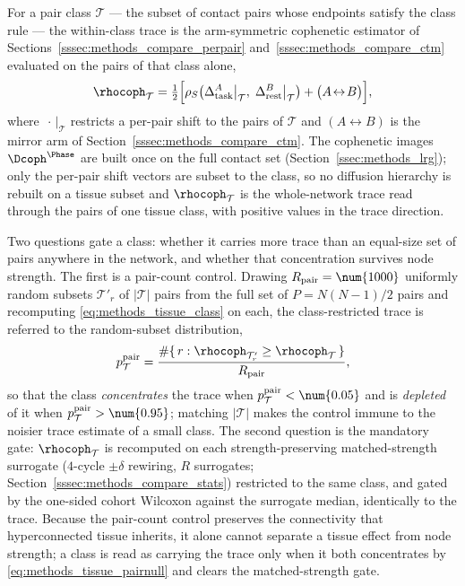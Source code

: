 For a pair class \(\mathcal{T}\) --- the subset of contact pairs whose endpoints satisfy the class rule --- the within-class trace is the arm-symmetric cophenetic estimator of Sections~\ref{sssec:methods_compare_perpair} and~\ref{sssec:methods_compare_ctm} evaluated on the pairs of that class alone,
\begin{equation}
    \rhocoph_{\mathcal{T}} = \tfrac{1}{2}\Big[\rho_{S}\!\left(\Delta_{\rm task}^{A}\big|_{\mathcal{T}},\; \Delta_{\rm rest}^{B}\big|_{\mathcal{T}}\right) + \big(A\!\leftrightarrow\!B\big)\Big],
    \label{eq:methods_tissue_class}
\end{equation}
where \(\,\cdot\,\big|_{\mathcal{T}}\) restricts a per-pair shift to the pairs of \(\mathcal{T}\) and \((A\!\leftrightarrow\!B)\) is the mirror arm of Section~\ref{sssec:methods_compare_ctm}. The cophenetic images \(\Dcoph^{\Phase}\) are built once on the full contact set (Section~\ref{ssec:methods_lrg}); only the per-pair shift vectors are subset to the class, so no diffusion hierarchy is rebuilt on a tissue subset and \(\rhocoph_{\mathcal{T}}\) is the whole-network trace read through the pairs of one tissue class, with positive values in the trace direction.

Two questions gate a class: whether it carries more trace than an equal-size set of pairs anywhere in the network, and whether that concentration survives node strength. The first is a pair-count control. Drawing \(R_{\rm pair} = \num{1000}\) uniformly random subsets \(\mathcal{T}'_{r}\) of \(|\mathcal{T}|\) pairs from the full set of \(P = N(N-1)/2\) pairs and recomputing \eqref{eq:methods_tissue_class} on each, the class-restricted trace is referred to the random-subset distribution,
\begin{equation}
    p^{\rm pair}_{\mathcal{T}} = \frac{\#\{\, r : \rhocoph_{\mathcal{T}'_{r}} \ge \rhocoph_{\mathcal{T}} \,\}}{R_{\rm pair}},
    \label{eq:methods_tissue_pairnull}
\end{equation}
so that the class \emph{concentrates} the trace when \(p^{\rm pair}_{\mathcal{T}} < \num{0.05}\) and is \emph{depleted} of it when \(p^{\rm pair}_{\mathcal{T}} > \num{0.95}\); matching \(|\mathcal{T}|\) makes the control immune to the noisier trace estimate of a small class. The second question is the mandatory gate: \(\rhocoph_{\mathcal{T}}\) is recomputed on each strength-preserving matched-strength surrogate (\(4\)-cycle \(\pm\delta\) rewiring, \(R\) surrogates; Section~\ref{sssec:methods_compare_stats}) restricted to the same class, and gated by the one-sided cohort Wilcoxon against the surrogate median, identically to the trace. Because the pair-count control preserves the connectivity that hyperconnected tissue inherits, it alone cannot separate a tissue effect from node strength; a class is read as carrying the trace only when it both concentrates by \eqref{eq:methods_tissue_pairnull} and clears the matched-strength gate.

